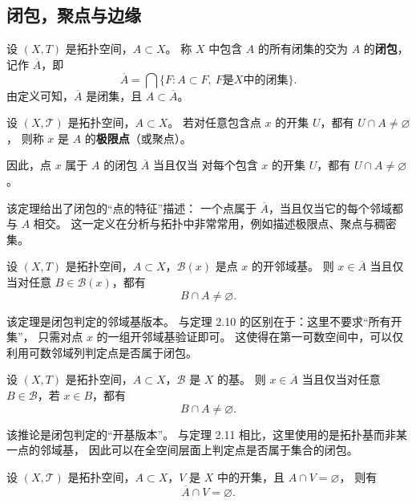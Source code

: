 \subsection{闭包，聚点与边缘}
\begin{definition}[闭包-包含集合的最小比集]
设 $(X,T)$ 是拓扑空间，$A\subset X$。  
称 $X$ 中包含 $A$ 的所有闭集的交为 $A$ 的\textbf{闭包}，记作 $\overline{A}$，即
\[
\overline{A}=\bigcap\{F : A\subset F,\ F\text{是}X\text{中的闭集}\}.
\]
由定义可知，$\overline{A}$ 是闭集，且 $A\subset \overline{A}$。
\end{definition}
\begin{theorem}[判断一个点是不是在闭包里面的最新方法]
    

设 $(X,\mathcal{T})$ 是拓扑空间，$A \subset X$。  
若对任意包含点 $x$ 的开集 $U$，都有 $U \cap A \ne \varnothing$，  
则称 $x$ 是 $A$ 的\textbf{极限点}（或聚点）。  

因此，点 $x$ 属于 $A$ 的闭包 $\overline{A}$ 当且仅当  
对每个包含 $x$ 的开集 $U$，都有 $U \cap A \ne \varnothing$。
\end{theorem}

\begin{remark}
该定理给出了闭包的“点的特征”描述：
一个点属于 $\overline{A}$，当且仅当它的每个邻域都与 $A$ 相交。
这一定义在分析与拓扑中非常常用，例如描述极限点、聚点与稠密集。
\end{remark}
\begin{theorem}
设 $(X,T)$ 是拓扑空间，$A\subset X$，$\mathcal{B}(x)$ 是点 $x$ 的开邻域基。  
则 $x\in\overline{A}$ 当且仅当对任意 $B\in\mathcal{B}(x)$，都有
\[
B\cap A\neq\varnothing.
\]
\end{theorem}
\begin{remark}
该定理是闭包判定的邻域基版本。  
与定理 2.10 的区别在于：这里不要求“所有开集”，  
只需对点 $x$ 的一组开邻域基验证即可。
这使得在第一可数空间中，可以仅利用可数邻域列判定点是否属于闭包。
\end{remark}
\begin{corollary}
设 $(X,T)$ 是拓扑空间，$A\subset X$，$\mathcal{B}$ 是 $X$ 的基。  
则 $x\in\overline{A}$ 当且仅当对任意 $B\in\mathcal{B}$，若 $x\in B$，都有
\[
B\cap A\neq\varnothing.
\]
\end{corollary}
\begin{remark}
该推论是闭包判定的“开基版本”。  
与定理 2.11 相比，这里使用的是拓扑基而非某一点的邻域基，  
因此可以在全空间层面上判定点是否属于集合的闭包。
\end{remark}
\begin{corollary}
设 $(X,\mathcal{T})$ 是拓扑空间，$A\subset X$，$V$ 是 $X$ 中的开集，且 $A\cap V=\varnothing$，  
则有
\[
\overline{A}\cap V=\varnothing.
\]
\end{corollary}

